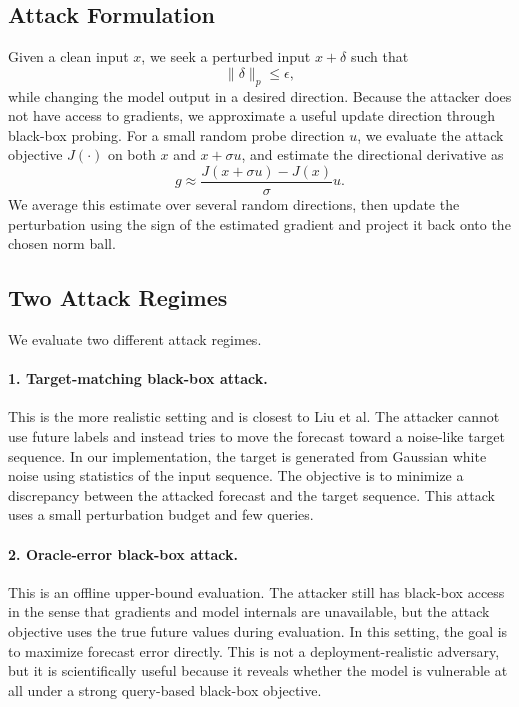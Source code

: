 \documentclass[11pt]{article}
\begin{document}
\subsection{Attack Formulation}
Given a clean input $x$, we seek a perturbed input $x+\delta$ such that
\[
\|\delta\|_p \le \epsilon,
\]
while changing the model output in a desired direction. Because the attacker does not have access to gradients, we approximate a useful update direction through black-box probing. For a small random probe direction $u$, we evaluate the attack objective $J(\cdot)$ on both $x$ and $x+\sigma u$, and estimate the directional derivative as
\[
g \approx \frac{J(x+\sigma u)-J(x)}{\sigma}u.
\]
We average this estimate over several random directions, then update the perturbation using the sign of the estimated gradient and project it back onto the chosen norm ball.

\subsection{Two Attack Regimes}
We evaluate two different attack regimes.

\paragraph{1. Target-matching black-box attack.}
This is the more realistic setting and is closest to Liu et al. The attacker cannot use future labels and instead tries to move the forecast toward a noise-like target sequence. In our implementation, the target is generated from Gaussian white noise using statistics of the input sequence. The objective is to minimize a discrepancy between the attacked forecast and the target sequence. This attack uses a small perturbation budget and few queries.

\paragraph{2. Oracle-error black-box attack.}
This is an offline upper-bound evaluation. The attacker still has black-box access in the sense that gradients and model internals are unavailable, but the attack objective uses the true future values during evaluation. In this setting, the goal is to maximize forecast error directly. This is not a deployment-realistic adversary, but it is scientifically useful because it reveals whether the model is vulnerable at all under a strong query-based black-box objective.
\end{document}
